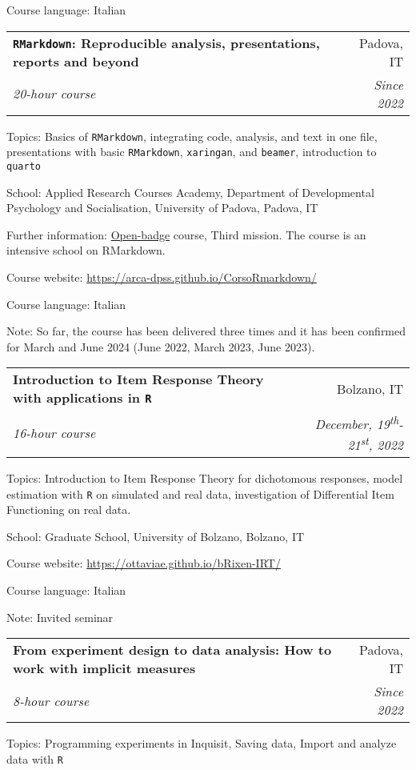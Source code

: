 \documentclass[letterpaper,12pt]{article}
\makeatletter
\newcommand{\resumeSubheading}[4]{
  \vspace{-1pt}\item
    \begin{tabular*}{0.97\textwidth}{l@{\extracolsep{\fill}}r}
      \textbf{#1} & #2 \\
      \textit{\small#3} & \textit{\small #4} \\
    \end{tabular*}\vspace{-5pt}
}
\makeatother
\begin{document}
{\small Course language: Italian}


\resumeSubheading {\texttt{RMarkdown}: Reproducible analysis, presentations, reports and beyond}{Padova, IT}{20-hour course}{\small{Since 2022}}

{\small Topics: Basics of \texttt{RMarkdown}, integrating code, analysis, and text in one file, presentations with basic \texttt{RMarkdown}, \texttt{xaringan}, and \texttt{beamer}, introduction to \texttt{quarto}}

{\small School: Applied Research Courses Academy, Department of Developmental Psychology and Socialisation, University of Padova, Padova, IT} 

{\small Further information: \href{https://bestr.it/badge/show/3657}{Open-badge} course, Third mission. The course is an intensive school on RMarkdown.  } 

{\small Course website: \href{https://arca-dpss.github.io/CorsoRmarkdown/}{https://arca-dpss.github.io/CorsoRmarkdown/}}

{\small Course language: Italian}

{\small Note: So far, the course has been delivered three times and it has been confirmed for March and June 2024 (June 2022, March 2023, June 2023).}

\resumeSubheading {Introduction to Item Response Theory with applications in \texttt{R}}{Bolzano, IT}{16-hour course}{December, 19\textsuperscript{th}-21\textsuperscript{st}, 2022}

{\small Topics: Introduction to Item Response Theory for dichotomous responses, model estimation with \texttt{R} on simulated and real data, investigation of Differential Item Functioning on real data. }

{\small School: Graduate School, University of Bolzano, Bolzano, IT} 


{\small Course website:  \href{https://ottaviae.github.io/bRixen-IRT/}{https://ottaviae.github.io/bRixen-IRT/}} 

{\small Course language: Italian}

{\small Note: Invited seminar}

\resumeSubheading {From experiment design to data analysis: How to work with implicit measures}{Padova, IT}{8-hour course}{Since 2022}

{\small Topics: Programming experiments in Inquisit, Saving data, Import and analyze data with \texttt{R}}
\end{document}
